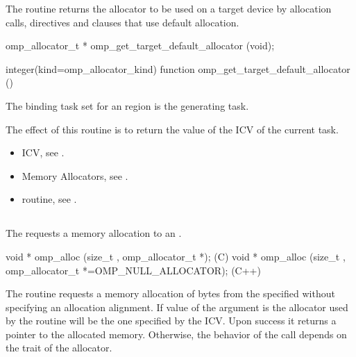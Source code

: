 \summary
The  routine returns the allocator to be used on a target device by allocation calls, directives and clauses that use default allocation.

\format
\ccppspecificstart
\begin{boxedcode}
omp_allocator_t * omp_get_target_default_allocator (void);
\end{boxedcode}
\ccppspecificend
\fortranspecificstart
\begin{boxedcode}
integer(kind=omp_allocator_kind) 
function omp_get_target_default_allocator ()
\end{boxedcode}
\fortranspecificend

\binding

The binding task set for an  region is the generating task.

\effect

The effect of this routine is to return the value of the  ICV of the current task.

\crossreferences
\begin{itemize}
\item {} ICV, see .
\item Memory Allocators, see .
\item {} routine, see .
\end{itemize}

\ccppspecificstart


\subsection{}
\label{subsec:omp_alloc}

\summary
The  requests a memory allocation to an .

\format
\begin{boxedcode}
void * omp_alloc (size_t , omp_allocator_t *);  (C)
void * omp_alloc (size_t , 
           omp_allocator_t *=OMP_NULL_ALLOCATOR); (C++)
\end{boxedcode}

\effect

The  routine requests a memory allocation of  bytes from the specified  without specifying an allocation alignment. If value of the  argument is 
 the allocator used by the routine will be the one specified by the  ICV.
Upon success it returns a pointer to the allocated memory. Otherwise, the behavior of the call depends on the  trait of the allocator.

